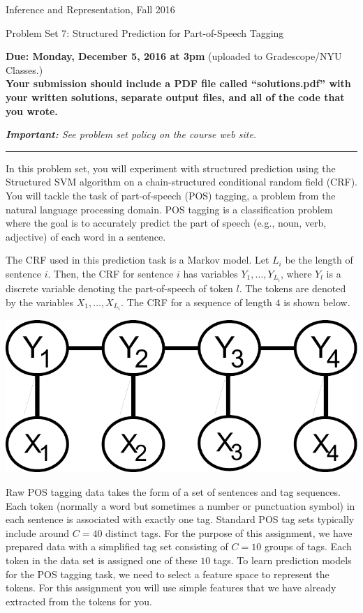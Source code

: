 \documentclass{article}
\newcommand{\ruleskip}{\bigskip\hrule\bigskip}
\begin{document}
\pagestyle{myheadings} 

{\LARGE
\begin{center}Inference and Representation, Fall 2016\end{center}
}

{\Large
Problem Set 7: Structured Prediction for Part-of-Speech Tagging
}

{\bf Due: Monday, December 5, 2016 at 3pm}  (uploaded to Gradescope/NYU Classes.)\\

{\bf Your submission should include a PDF file called ``solutions.pdf''
  with your written solutions, separate output files, and all of the
  code that you wrote.}

{\em {\bf Important:} See problem set policy on the course web site.}
\ruleskip

In this problem set, you will experiment with structured prediction using the Structured SVM algorithm on a chain-structured conditional random field (CRF). You will tackle the task of part-of-speech (POS) tagging, a problem from the natural language processing domain. POS tagging is a classification problem where the goal is to accurately predict the part of speech (e.g., noun, verb, adjective) of each word in a sentence. 

The CRF used in this prediction task is a Markov model. Let $L_i$ be the length of sentence $i$. Then, the CRF for sentence $i$ has variables $Y_1, \ldots, Y_{L_i}$, where $Y_l$ is a discrete variable denoting the part-of-speech of token $l$. The tokens are denoted by the variables $X_1, \ldots, X_{L_i}$. The CRF for a sequence of length $4$ is shown below.
\begin{center}
    \includegraphics[scale=0.35]{crf.pdf}
\end{center}

Raw POS tagging data takes the form of a set of sentences and tag sequences. Each token (normally a word but sometimes a number or punctuation symbol) in each sentence is associated with exactly one tag. Standard POS tag sets typically include around $C=40$ distinct tags. For the purpose of this assignment, we have prepared data with a simplified tag set consisting of $C=10$ groups of tags. Each token in the data set is assigned one of these $10$ tags. To learn prediction models for the POS tagging task, we need to select a feature space to represent the tokens. For this assignment you will use simple features that we have already extracted from the tokens for you.
\end{document}
